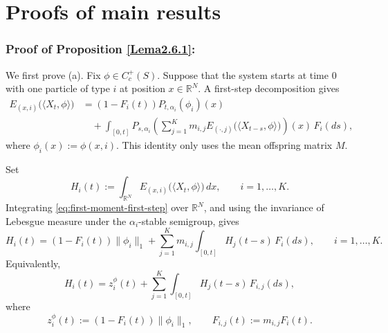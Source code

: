 \documentclass[reqno,final,11pt]{amsart}
\newcommand{\1}{\mathbbm{1}}
\theoremstyle{plain}
\theoremstyle{definition}
\theoremstyle{remark}
\begin{document}
\section{Proofs of main results}\label{PROOFS}


\subsubsection*{Proof of Proposition \ref{Lema2.6.1}:}
We first prove \textup{(a)}. Fix \(\phi\in C_c^+(S)\). Suppose that the
system starts at time \(0\) with one particle of type \(i\) at position
\(x\in\mathbb R^N\). A first-step decomposition gives
\begin{equation}\label{eq:first-moment-first-step}
\begin{split}
E_{(x,i)}\big(\langle X_t,\phi\rangle\big)
&=
(1-F_i(t))P_{t,\alpha_i}(\phi_i)(x)
\\
&\quad+
\int_{[0,t]}
P_{s,\alpha_i}
\left(
\sum_{j=1}^K
m_{i,j}
E_{(\cdot,j)}
\big(\langle X_{t-s},\phi\rangle\big)
\right)(x)
\,F_i(ds),
\end{split}
\end{equation}
where \(\phi_i(x):=\phi(x,i)\). This identity only uses the mean offspring
matrix \(M\).

Set
\[
H_i(t):=
\int_{\mathbb R^N}
E_{(x,i)}
\big(\langle X_t,\phi\rangle\big)\,dx,
\qquad i=1,\dots,K.
\]
Integrating \eqref{eq:first-moment-first-step} over \(\mathbb R^N\), and using
the invariance of Lebesgue measure under the \(\alpha_i\)-stable semigroup,
gives
\begin{equation}\label{eq:first-moment-integrated-system}
H_i(t)
=
(1-F_i(t))\|\phi_i\|_1
+
\sum_{j=1}^K
m_{i,j}
\int_{[0,t]}
H_j(t-s)\,F_i(ds),
\qquad i=1,\dots,K.
\end{equation}
Equivalently,
\[
H_i(t)
=
z_i^\phi(t)
+
\sum_{j=1}^K
\int_{[0,t]}H_j(t-s)\,F_{i,j}(ds),
\]
where
\[
z_i^\phi(t):=(1-F_i(t))\|\phi_i\|_1,
\qquad
F_{i,j}(t):=m_{i,j}F_i(t).
\]
\end{document}
